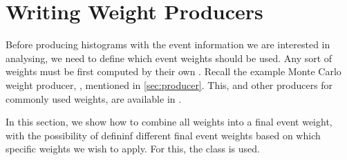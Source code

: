 \section{Writing Weight Producers}\label{sec:event_weights}

Before producing histograms with the event information we are interested in analysing, we need to define which event weights should be used.
Any sort of weights must be first computed by their own . Recall the example Monte Carlo weight producer, , mentioned in \ref{sec:producer}.
This, and other producers for commonly used weights, are available in .

In this section, we show how to combine all weights into a final event weight, with the possibility of defininf different final event weights based on which specific weights we wish to apply.
For this, the  class is used.
